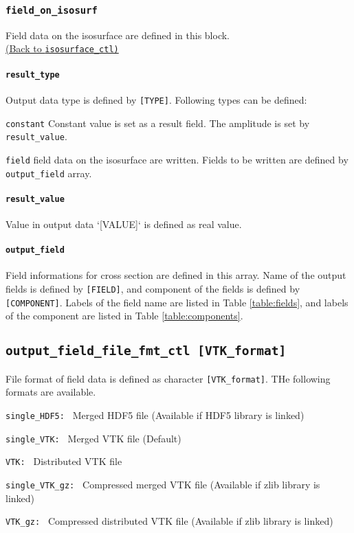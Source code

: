 %
\subsubsection{\tt field\_on\_isosurf}
\label{href_t:field_on_isosurf}
Field data on the isosurface are defined in this block. \\
\hyperref[href_i:isosurface_ctl]{(Back to {\tt isosurface\_ctl)}}

%
\paragraph{\tt result\_type}
\label{href_t:result_type}
Output data type is defined by \verb|[TYPE]|. Following types can be defined:
%
\begin{description}
	\item{\tt constant} Constant value is set as a result field. The amplitude is set by \verb|result_value|.
	\item{\tt field} field data on the isosurface are written. Fields to be written are defined by \verb|output_field| array.
\end{description}

%
\paragraph{\tt result\_value}
\label{href_t:result_value}
Value in output data `[VALUE]` is defined as real value.


%
\paragraph{\tt output\_field}
\label{href_t:iso_output_field}
Field informations for cross section are defined in this array. Name of the output fields is defined by \verb|[FIELD]|, and component of the fields is defined by \verb|[COMPONENT]|. Labels of the field name are listed in Table \ref{table:fields}, and labels of the component are listed in Table \ref{table:components}. \\
%
%
\subsection{\tt output\_field\_file\_fmt\_ctl  [VTK\_format]}
\label{href_t:output_field_file_fmt_ctl}
File format of field data is defined as character \verb|[VTK_format]|. THe following formats are available.
%
\begin{description}
\item{\tt single\_HDF5: }  Merged HDF5 file (Available if HDF5 library is linked)
\item{\tt single\_VTK: }   Merged VTK file (Default)
\item{\tt VTK: }           Distributed VTK file
\item{\tt single\_VTK\_gz: }   Compressed merged VTK file (Available if zlib library is linked)
\item{\tt VTK\_gz: }           Compressed distributed VTK file (Available if zlib library is linked)
\end{description}

